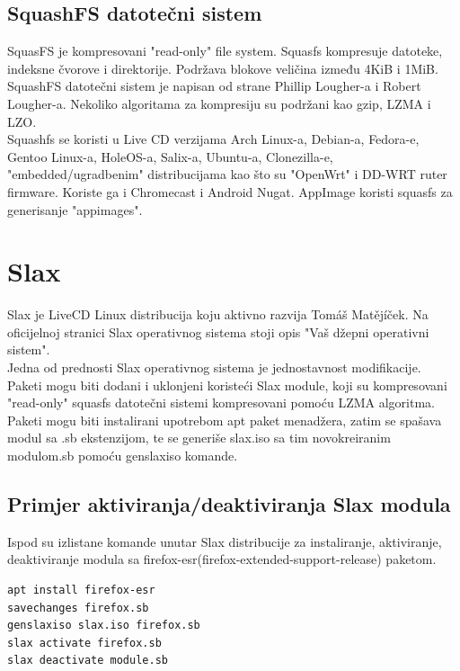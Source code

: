 \documentclass[12pt,vi]{mitthesis}
\begin{document}
\subsection*{SquashFS datotečni sistem}
\indent
SquasFS\cite[str.~303]{linux-bible}\cite{squashfs-howto}\cite{squashfs-deployment} je kompresovani "read-only" file system. Squasfs kompresuje datoteke, indeksne čvorove i direktorije. Podržava blokove veličina između 4KiB i 1MiB.\\
\indent
SquashFS datotečni sistem je napisan od strane 	Phillip Lougher-a i Robert Lougher-a. 
Nekoliko algoritama za kompresiju su podržani kao gzip, LZMA i LZO.\\
Squashfs se koristi u Live CD verzijama Arch Linux-a, Debian-a, Fedora-e, Gentoo Linux-a, HoleOS-a, Salix-a, Ubuntu-a, Clonezilla-e, "embedded/ugradbenim" distribucijama kao što su "OpenWrt" i DD-WRT ruter firmware. Koriste ga i Chromecast i Android Nugat. AppImage koristi squasfs za generisanje "appimages".\\

\section*{Slax}
\indent
Slax\cite{slax-org}\cite{slax-wiki} je LiveCD Linux distribucija koju aktivno razvija Tomáš Matějíček. Na oficijelnoj stranici Slax operativnog sistema stoji opis "Vaš džepni operativni sistem".\\
\indent
Jedna od prednosti Slax operativnog sistema je jednostavnost modifikacije. Paketi mogu biti dodani i uklonjeni koristeći Slax module, koji su kompresovani "read-only" squasfs datotečni sistemi kompresovani pomoću LZMA algoritma.\\
Paketi mogu biti instalirani upotrebom apt paket menadžera, zatim se spašava modul sa .sb ekstenzijom, te se generiše slax.iso sa tim novokreiranim modulom.sb pomoću genslaxiso komande.\\
\subsection*{Primjer aktiviranja/deaktiviranja Slax modula}
\indent
Ispod su izlistane komande unutar Slax distribucije za instaliranje, aktiviranje, deaktiviranje modula sa firefox-esr(firefox-extended-support-release) paketom.
\begin{lstlisting}[style=BashInputStyle]
apt install firefox-esr
savechanges firefox.sb
genslaxiso slax.iso firefox.sb
slax activate firefox.sb
slax deactivate module.sb
\end{lstlisting}
\end{document}
